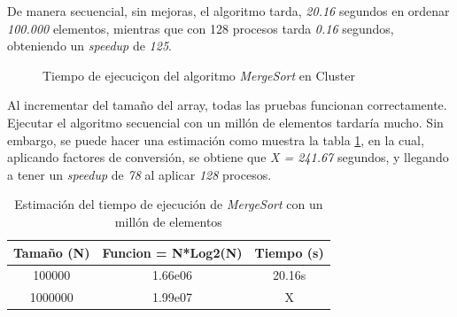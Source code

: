 		De manera secuencial, sin mejoras, el algoritmo tarda, \textit{20.16} segundos en ordenar \textit{100.000} elementos, mientras que con 128 procesos tarda \textit{0.16} segundos, obteniendo un \textit{speedup} de \textit{125}. 
		
		\begin{figure}[!h]
			\centering
			\caption{Tiempo de ejecuciçon del algoritmo \textit{MergeSort} en Cluster}
			\label{fig:mergesort_cluster}
		\end{figure}
		
		Al incrementar del tamaño del array, todas las pruebas funcionan correctamente. Ejecutar el algoritmo secuencial con un millón de elementos tardaría mucho. Sin embargo, se puede hacer una estimación como muestra la tabla \ref{tab:estimacion_mergesort}, en la cual, aplicando factores de conversión, se obtiene que \textit{X = 241.67} segundos, y llegando a tener un \textit{speedup} de \textit{78} al aplicar \textit{128} procesos.
		
		\begin{table}[!h]
			\centering
			\begin{tabular}{|c|c|c|}
				\hline
				\rowcolor{lightgray}
				\textbf{Tamaño (N)} & \textbf{Funcion = N*Log2(N)} & \textbf{Tiempo (s)} \\
				\hline
				100000 & 1.66e06 & 20.16s \\
				\hline
				1000000 & 1.99e07 & X \\
				\hline
				
			\end{tabular}
			\caption{Estimación del tiempo de ejecución de \textit{MergeSort} con un millón de elementos}
			\label{tab:estimacion_mergesort}
		\end{table}
		
